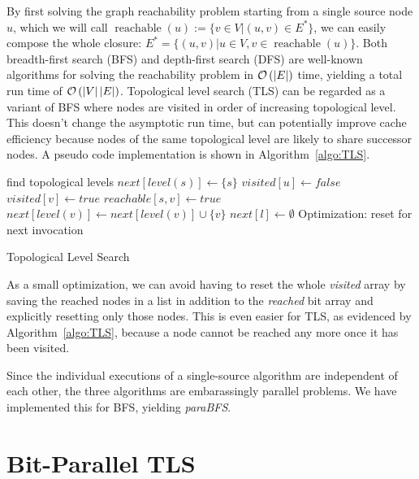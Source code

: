 \documentclass[12pt,a4paper,twoside]{article}
\DeclareMathOperator*{\reachable}{reachable}
\begin{document}
By first solving the graph reachability problem starting from a single source node $u$, which we will call $\reachable(u) := \{v \in V | (u, v) \in E^*\}$, we can easily compose the whole closure: $E^* = \{(u, v) | u \in V, v \in \reachable(u)\}$. Both breadth-first search (BFS) and depth-first search (DFS) are well-known algorithms for solving the reachability problem in $\mathcal{O}\left(\left|E\right|\right)$ time, yielding a total run time of $\mathcal{O}\left(\left|V\right| \left|E\right|\right)$. Topological level search (TLS) can be regarded as a variant of BFS where nodes are visited in order of increasing topological level. This doesn't change the asymptotic run time, but can potentially improve cache efficiency because nodes of the same topological level are likely to share successor nodes. A pseudo code implementation is shown in Algorithm~\ref{algo:TLS}.

\begin{algorithm}
  \begin{algorithmic}
      \State find topological levels
      \State $next[level(s)] \gets \{s\}$
          \State $visited[u] \gets false$
              \State $visited[v] \gets true$
              \State $reachable[s, v] \gets true$
              \State $next[level(v)] \gets next[level(v)] \cup \{v\}$
            \EndIf
          \EndFor
        \EndFor
        \State $next[l] \gets \emptyset$ \Comment Optimization: reset for next invocation
      \EndFor
    \EndFunction
  \end{algorithmic}
  \caption{Topological Level Search}
  \label{algo:TLS}
\end{algorithm}

As a small optimization, we can avoid having to reset the whole \emph{visited} array by saving the reached nodes in a list in addition to the \emph{reached} bit array and explicitly resetting only those nodes. This is even easier for TLS, as evidenced by Algorithm~\ref{algo:TLS}, because a node cannot be reached any more once it has been visited.

Since the individual executions of a single-source algorithm are independent of each other, the three algorithms are embarassingly parallel problems. We have implemented this for BFS, yielding \emph{paraBFS}.

\section{Bit-Parallel TLS}
\end{document}
